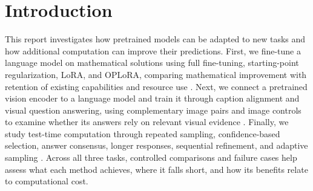 \section{Introduction}
\label{sec:introduction}

This report investigates how pretrained models can be adapted to new tasks and how additional computation can improve their predictions. First, we fine-tune a language model on mathematical solutions using full fine-tuning, starting-point regularization, LoRA, and OPLoRA, comparing mathematical improvement with retention of existing capabilities and resource use \citep{li2018explicit,hu2021lora,xiong2025oplora,biderman2024lora}. Next, we connect a pretrained vision encoder to a language model and train it through caption alignment and visual question answering, using complementary image pairs and image controls to examine whether its answers rely on relevant visual evidence \citep{liu2023visual,goyal2017making}. Finally, we study test-time computation through repeated sampling, confidence-based selection, answer consensus, longer responses, sequential refinement, and adaptive sampling \citep{wang2022selfconsistency,kang2025selfcertainty,usman2026visconf,madaan2023selfrefine,aggarwal2023adaptive}. Across all three tasks, controlled comparisons and failure cases help assess what each method achieves, where it falls short, and how its benefits relate to computational cost.
